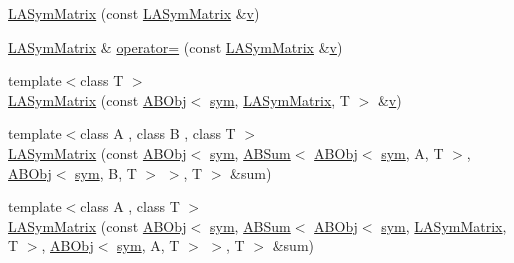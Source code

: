 \begin{DoxyCompactItemize}
\item 
\mbox{\hyperlink{classROOT_1_1Minuit2_1_1LASymMatrix_ac74006982da0bcda789c1237e0022033}{L\+A\+Sym\+Matrix}} (const \mbox{\hyperlink{classROOT_1_1Minuit2_1_1LASymMatrix}{L\+A\+Sym\+Matrix}} \&\mbox{\hyperlink{adat__devel_2lib_2hadron_2hadron__timeslice_8cc_a716fc87f5e814be3ceee2405ed6ff22a}{v}})
\item 
\mbox{\hyperlink{classROOT_1_1Minuit2_1_1LASymMatrix}{L\+A\+Sym\+Matrix}} \& \mbox{\hyperlink{classROOT_1_1Minuit2_1_1LASymMatrix_a31521afba8179a28e7744af51850922e}{operator=}} (const \mbox{\hyperlink{classROOT_1_1Minuit2_1_1LASymMatrix}{L\+A\+Sym\+Matrix}} \&\mbox{\hyperlink{adat__devel_2lib_2hadron_2hadron__timeslice_8cc_a716fc87f5e814be3ceee2405ed6ff22a}{v}})
\item 
{\footnotesize template$<$class T $>$ }\\\mbox{\hyperlink{classROOT_1_1Minuit2_1_1LASymMatrix_ab44b18a4c1b65cb054c884661843a4a0}{L\+A\+Sym\+Matrix}} (const \mbox{\hyperlink{classROOT_1_1Minuit2_1_1ABObj}{A\+B\+Obj}}$<$ \mbox{\hyperlink{classROOT_1_1Minuit2_1_1sym}{sym}}, \mbox{\hyperlink{classROOT_1_1Minuit2_1_1LASymMatrix}{L\+A\+Sym\+Matrix}}, T $>$ \&\mbox{\hyperlink{adat__devel_2lib_2hadron_2hadron__timeslice_8cc_a716fc87f5e814be3ceee2405ed6ff22a}{v}})
\item 
{\footnotesize template$<$class A , class B , class T $>$ }\\\mbox{\hyperlink{classROOT_1_1Minuit2_1_1LASymMatrix_a50f5a1e686ba0b5ac1d296432bdea484}{L\+A\+Sym\+Matrix}} (const \mbox{\hyperlink{classROOT_1_1Minuit2_1_1ABObj}{A\+B\+Obj}}$<$ \mbox{\hyperlink{classROOT_1_1Minuit2_1_1sym}{sym}}, \mbox{\hyperlink{classROOT_1_1Minuit2_1_1ABSum}{A\+B\+Sum}}$<$ \mbox{\hyperlink{classROOT_1_1Minuit2_1_1ABObj}{A\+B\+Obj}}$<$ \mbox{\hyperlink{classROOT_1_1Minuit2_1_1sym}{sym}}, A, T $>$, \mbox{\hyperlink{classROOT_1_1Minuit2_1_1ABObj}{A\+B\+Obj}}$<$ \mbox{\hyperlink{classROOT_1_1Minuit2_1_1sym}{sym}}, B, T $>$ $>$, T $>$ \&sum)
\item 
{\footnotesize template$<$class A , class T $>$ }\\\mbox{\hyperlink{classROOT_1_1Minuit2_1_1LASymMatrix_a252615373ae5ffe035baa9e8221e67e3}{L\+A\+Sym\+Matrix}} (const \mbox{\hyperlink{classROOT_1_1Minuit2_1_1ABObj}{A\+B\+Obj}}$<$ \mbox{\hyperlink{classROOT_1_1Minuit2_1_1sym}{sym}}, \mbox{\hyperlink{classROOT_1_1Minuit2_1_1ABSum}{A\+B\+Sum}}$<$ \mbox{\hyperlink{classROOT_1_1Minuit2_1_1ABObj}{A\+B\+Obj}}$<$ \mbox{\hyperlink{classROOT_1_1Minuit2_1_1sym}{sym}}, \mbox{\hyperlink{classROOT_1_1Minuit2_1_1LASymMatrix}{L\+A\+Sym\+Matrix}}, T $>$, \mbox{\hyperlink{classROOT_1_1Minuit2_1_1ABObj}{A\+B\+Obj}}$<$ \mbox{\hyperlink{classROOT_1_1Minuit2_1_1sym}{sym}}, A, T $>$ $>$, T $>$ \&sum)

\end{DoxyCompactItemize}
